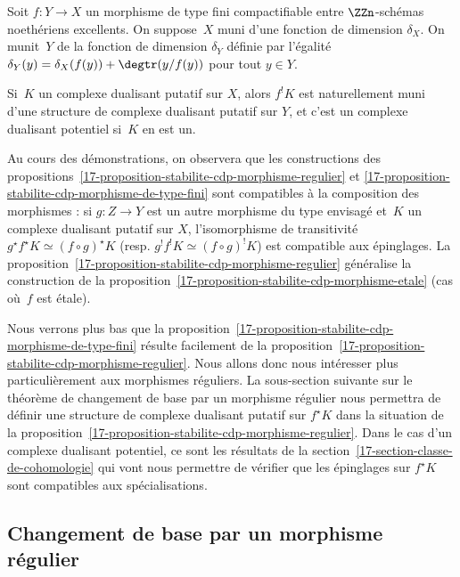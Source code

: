 \documentclass[10pt]{../fichiers-configuration-latex/smfart}
\begin{document}
\begin{proposition2}\label{17-proposition-stabilite-cdp-morphisme-de-type-fini}
Soit $f\colon Y\to X$ un morphisme de type fini compactifiable
entre $\ZZn$-schémas noethériens excellents. On suppose $X$ muni
d'une fonction de dimension $\delta_X$. On munit $Y$ de la fonction de
dimension $\delta_Y$ définie par l'égalité
$\delta_Y(y)=\delta_X(f(y))+\degtr(y/f(y))$
pour tout $y\in Y$.

Si $K$ un complexe dualisant putatif sur $X$, alors $f^! K$ est
naturellement muni d'une structure de complexe dualisant putatif sur $Y$,
et c'est un complexe dualisant potentiel si $K$ en est un.
\end{proposition2}

\begin{remarque2}\label{17-remarque-cdp-compatibilite-composition}
Au cours des démonstrations, on observera que les constructions des
propositions~\ref{17-proposition-stabilite-cdp-morphisme-regulier} et
\ref{17-proposition-stabilite-cdp-morphisme-de-type-fini} sont compatibles à
la composition des morphismes : si $g\colon Z\to Y$ est un autre morphisme
du type envisagé et $K$ un complexe dualisant putatif sur $X$,
l'isomorphisme de transitivité $g^\star f^\star K\simeq (f\circ g)^\star K$
(resp. $g^! f^! K\simeq (f\circ g)^! K$) est compatible aux épinglages.
La proposition~\ref{17-proposition-stabilite-cdp-morphisme-regulier}
généralise la construction de la
proposition~\ref{17-proposition-stabilite-cdp-morphisme-etale} (cas où $f$ est
étale).
\end{remarque2}

Nous verrons plus bas que la
proposition~\ref{17-proposition-stabilite-cdp-morphisme-de-type-fini} résulte
facilement de la
proposition~\ref{17-proposition-stabilite-cdp-morphisme-regulier}. Nous allons
donc nous intéresser plus particulièrement aux morphismes réguliers. La
sous-section suivante sur le théorème de changement de base par un
morphisme régulier nous permettra de définir une structure de complexe
dualisant putatif sur $f^\star K$ dans la situation de la
proposition~\ref{17-proposition-stabilite-cdp-morphisme-regulier}. Dans le cas
d'un complexe dualisant potentiel, ce sont les résultats de la
section~\ref{17-section-classe-de-cohomologie} qui vont nous permettre de
vérifier que les épinglages sur $f^\star K$ sont compatibles aux
spécialisations.

\subsection{Changement de base par un morphisme régulier}%
\end{document}
